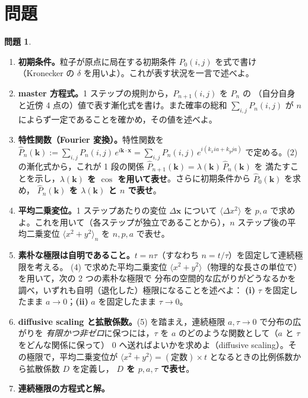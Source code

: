 \documentclass[dvipdfmx, uplatex]{jsarticle}
\newcommand{\bk}{\bm{k}}
\newcommand{\bx}{\bm{x}}
\theoremstyle{definition}
\newtheorem{prob}{問題}
\begin{document}
\section{問題}

\begin{prob}\label{prob:rw}
\begin{enumerate}
\item \textbf{初期条件。}粒子が原点に局在する初期条件 $P_0(i,j)$ を式で書け
（Kronecker の $\delta$ を用いよ）。これが表す状況を一言で述べよ。
\item \textbf{master 方程式。}1 ステップの規則から，$P_{n+1}(i,j)$ を $P_n$ の
（自分自身と近傍 4 点の）値で表す漸化式を書け。また確率の総和 $\sum_{i,j}P_n(i,j)$ が
$n$ によらず一定であることを確かめ，その値を述べよ。
\item \textbf{特性関数（Fourier 変換）。}特性関数を
$\displaystyle\hat P_n(\bk):=\sum_{i,j}P_n(i,j)\,e^{i\bk\cdot\bx}
=\sum_{i,j}P_n(i,j)\,e^{i(k_x ia+k_y ja)}$
で定める。(2) の漸化式から，これが 1 段の関係 $\hat P_{n+1}(\bk)=\lambda(\bk)\,\hat P_n(\bk)$ を
満たすことを示し，\textbf{$\lambda(\bk)$ を $\cos$ を用いて表せ}。さらに初期条件から $\hat P_0(\bk)$ を求め，
\textbf{$\hat P_n(\bk)$ を $\lambda(\bk)$ と $n$ で表せ}。
\item \textbf{平均二乗変位。}1 ステップあたりの変位 $\Delta\bx$ について $\langle\Delta x^2\rangle$ を
$p,a$ で求めよ。これを用いて（各ステップが独立であることから），$n$ ステップ後の平均二乗変位
$\langle x^2+y^2\rangle_n$ を $n,p,a$ で表せ。
\item \textbf{素朴な極限は自明であること。}$t=n\tau$（すなわち $n=t/\tau$）を固定して連続極限を考える。
(4) で求めた平均二乗変位 $\langle x^2+y^2\rangle$（物理的な長さの単位で）を用いて，次の 2 つの素朴な極限で
分布の空間的な広がりがどうなるかを調べ，いずれも自明（退化した）極限になることを述べよ：
\textbf{(i)} $\tau$ を固定したまま $a\to0$；\textbf{(ii)} $a$ を固定したまま $\tau\to0$。
\item \textbf{diffusive scaling と拡散係数。}(5) を踏まえ，連続極限 $a,\tau\to0$ で分布の広がりを
\emph{有限かつ非ゼロ}に保つには，$\tau$ を $a$ のどのような関数として（$a$ と $\tau$ をどんな関係に保って）
$0$ へ送ればよいかを求めよ（diffusive scaling）。その極限で，平均二乗変位が
$\langle x^2+y^2\rangle=(\text{定数})\times t$ となるときの比例係数から拡散係数 $D$ を定義し，
\textbf{$D$ を $p,a,\tau$ で表せ}。
\item \textbf{連続極限の方程式と解。}

\end{enumerate}
\end{prob}
\end{document}
